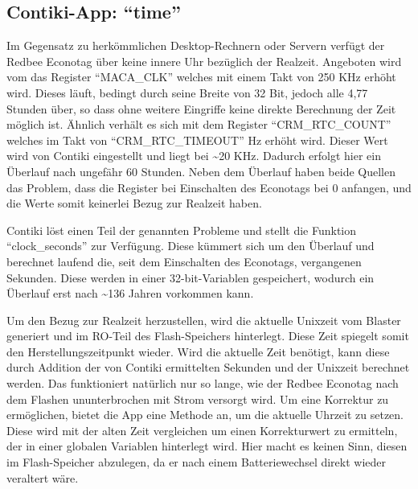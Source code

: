 \subsection{Contiki-App: "`time"'}

Im Gegensatz zu herkömmlichen Desktop-Rechnern oder Servern verfügt der Redbee Econotag über keine innere Uhr bezüglich der Realzeit.
Angeboten wird vom  das Register "`MACA\_CLK"' welches mit einem Takt von 250 KHz erhöht wird. Dieses läuft, bedingt durch
seine Breite von 32 Bit, jedoch alle 4,77 Stunden über, so dass ohne weitere Eingriffe keine direkte Berechnung der Zeit möglich ist.
Ähnlich verhält es sich mit dem Register "`CRM\_RTC\_COUNT"' welches im Takt von "`CRM\_RTC\_TIMEOUT"' Hz erhöht wird.
Dieser Wert wird von Contiki eingestellt und liegt bei \textasciitilde 20 KHz. Dadurch erfolgt hier ein Überlauf nach ungefähr 60 Stunden.
Neben dem Überlauf haben beide Quellen das Problem, dass die Register bei Einschalten des Econotags bei 0 anfangen, und die Werte somit
keinerlei Bezug zur Realzeit haben.

Contiki löst einen Teil der genannten Probleme und stellt die Funktion "`clock\_seconds"' zur Verfügung. Diese kümmert sich um den Überlauf
und berechnet laufend die, seit dem Einschalten des Econotags, vergangenen Sekunden. Diese werden in einer 32-bit-Variablen gespeichert,
wodurch ein Überlauf erst nach \textasciitilde 136 Jahren vorkommen kann.

Um den Bezug zur Realzeit herzustellen, wird die aktuelle Unixzeit vom Blaster generiert und im RO-Teil des Flash-Speichers hinterlegt.
Diese Zeit spiegelt somit den Herstellungszeitpunkt wieder. Wird die aktuelle Zeit benötigt, kann diese durch Addition der von Contiki
ermittelten Sekunden und der Unixzeit berechnet werden. Das funktioniert natürlich nur so lange, wie der Redbee Econotag nach dem Flashen
ununterbrochen mit Strom versorgt wird. Um eine Korrektur zu ermöglichen, bietet die App eine Methode an, um die aktuelle Uhrzeit zu setzen.
Diese wird mit der alten Zeit vergleichen um einen Korrekturwert zu ermitteln, der in einer globalen Variablen hinterlegt wird. Hier macht es
keinen Sinn, diesen im Flash-Speicher abzulegen, da er nach einem Batteriewechsel direkt wieder veraltert wäre.